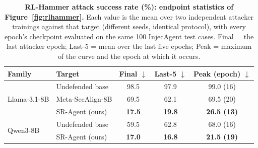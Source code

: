 \begin{table}[t]
\centering\small\setlength{\tabcolsep}{8pt}
\caption{\textbf{RL-Hammer attack success rate (\%): endpoint statistics of Figure~\ref{fig:rlhammer}.} Each value is the mean over two independent attacker trainings against that target (different seeds, identical protocol), with every epoch's checkpoint evaluated on the same 100 InjecAgent test cases. Final = the last attacker epoch; Last-5 = mean over the last five epochs; Peak = maximum of the curve and the epoch at which it occurs.}
\label{tab:rlhammer}
\begin{tabular}{llccc}
\toprule
\textbf{Family} & \textbf{Target} & \textbf{Final} $\downarrow$ & \textbf{Last-5} $\downarrow$ & \textbf{Peak (epoch)} $\downarrow$ \\
\midrule
\multirow{3}{*}{Llama-3.1-8B} & Undefended base & 98.5 & 97.9 & 99.0 (16) \\
 & Meta-SecAlign-8B & 69.5 & 62.1 & 69.5 (20) \\
 & SR-Agent (ours) & \textbf{17.5} & \textbf{19.8} & \textbf{26.5 (13)} \\
\midrule
\multirow{2}{*}{Qwen3-8B} & Undefended base & 59.5 & 62.8 & 68.0 (16) \\
 & SR-Agent (ours) & \textbf{17.0} & \textbf{16.8} & \textbf{21.5 (19)} \\
\bottomrule
\end{tabular}
\end{table}
